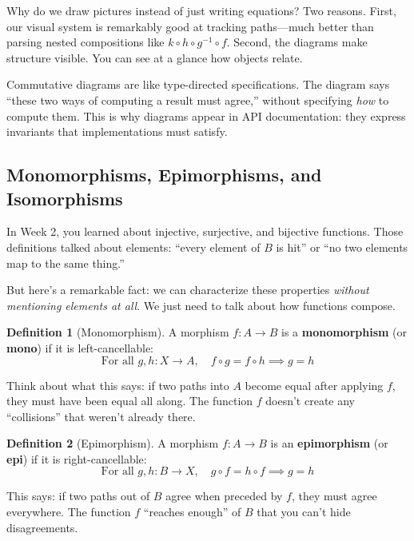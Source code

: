 \documentclass[11pt]{article}
\theoremstyle{definition}
\newtheorem{definition}{Definition}[section]
\theoremstyle{plain}
\theoremstyle{remark}
\begin{document}
Why do we draw pictures instead of just writing equations? Two reasons. First, our visual system is remarkably good at tracking paths---much better than parsing nested compositions like $k \circ h \circ g^{-1} \circ f$. Second, the diagrams make structure visible. You can see at a glance how objects relate.

\begin{programmingnote}
Commutative diagrams are like type-directed specifications. The diagram says ``these two ways of computing a result must agree,'' without specifying \emph{how} to compute them. This is why diagrams appear in API documentation: they express invariants that implementations must satisfy.
\end{programmingnote}

\subsection{Monomorphisms, Epimorphisms, and Isomorphisms}

In Week 2, you learned about injective, surjective, and bijective functions. Those definitions talked about elements: ``every element of $B$ is hit'' or ``no two elements map to the same thing.''

But here's a remarkable fact: we can characterize these properties \emph{without mentioning elements at all}. We just need to talk about how functions compose.

\begin{definition}[Monomorphism]
A morphism $f: A \to B$ is a \textbf{monomorphism} (or \textbf{mono}) if it is left-cancellable:
\[
\text{For all } g, h: X \to A, \quad f \circ g = f \circ h \implies g = h
\]
\end{definition}

Think about what this says: if two paths into $A$ become equal after applying $f$, they must have been equal all along. The function $f$ doesn't create any ``collisions'' that weren't already there.

\begin{definition}[Epimorphism]
A morphism $f: A \to B$ is an \textbf{epimorphism} (or \textbf{epi}) if it is right-cancellable:
\[
\text{For all } g, h: B \to X, \quad g \circ f = h \circ f \implies g = h
\]
\end{definition}

This says: if two paths out of $B$ agree when preceded by $f$, they must agree everywhere. The function $f$ ``reaches enough'' of $B$ that you can't hide disagreements.
\end{document}
